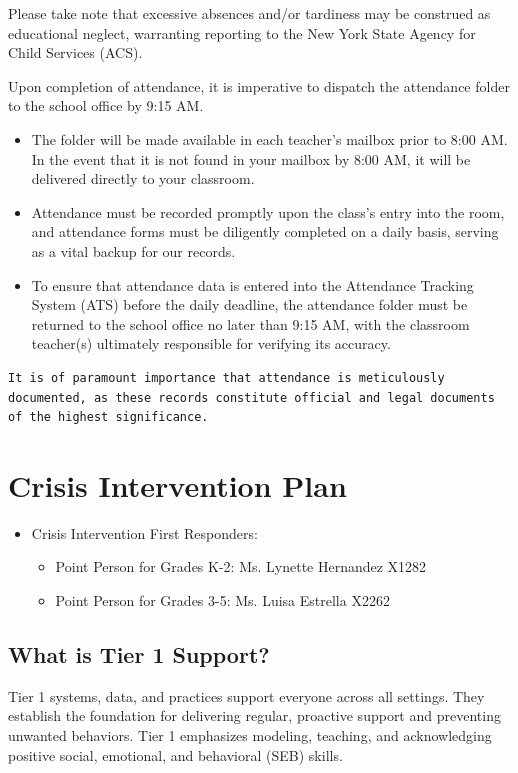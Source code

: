 \documentclass[11pt, letterpaper]{article}
\begin{document}
Please take note that excessive absences and/or tardiness may be construed as educational neglect, warranting reporting to the New York State Agency for Child Services (ACS).

Upon completion of attendance, it is imperative to dispatch the attendance folder to the school office by 9:15 AM. 
\begin{itemize}
\item The folder will be made available in each teacher's mailbox prior to 8:00 AM. In the event that it is not found in your mailbox by 8:00 AM, it will be delivered directly to your classroom. 
\item Attendance must be recorded promptly upon the class's entry into the room, and attendance forms must be diligently completed on a daily basis, serving as a vital backup for our records. 
\item To ensure that attendance data is entered into the Attendance Tracking System (ATS) before the daily deadline, the attendance folder must be returned to the school office no later than 9:15 AM, with the classroom teacher(s) ultimately responsible for verifying its accuracy.
\end{itemize}
\begin{Verbatim}[breaklines=true, breakanywhere=true]
It is of paramount importance that attendance is meticulously documented, as these records constitute official and legal documents of the highest significance.
\end{Verbatim}

\section{Crisis Intervention Plan}
\begin{itemize}
\item Crisis Intervention First Responders: 
	\begin{itemize}
	\item Point Person for Grades K-2: Ms. Lynette Hernandez X1282
	\item Point Person for Grades 3-5: Ms. Luisa Estrella X2262
	\end{itemize}
\end{itemize}
\subsection{What is Tier 1 Support?}
Tier 1 systems, data, and practices support everyone across all settings. They establish the foundation for delivering regular, proactive support and preventing unwanted behaviors. Tier 1 emphasizes modeling, teaching, and acknowledging positive social, emotional, and behavioral (SEB) skills. 
\end{document}
